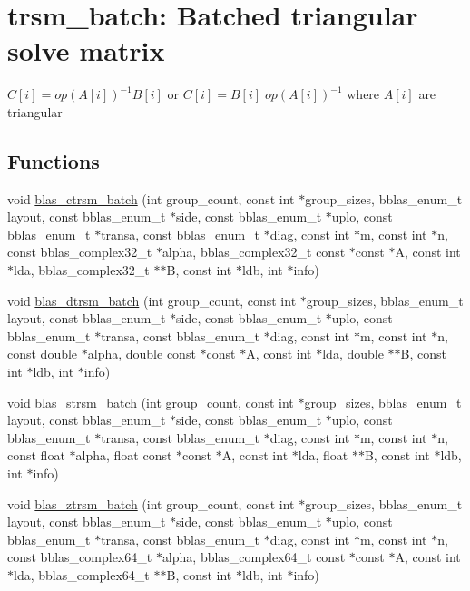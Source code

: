 \hypertarget{group__trsm__batch}{}\section{trsm\+\_\+batch\+: Batched triangular solve matrix}
\label{group__trsm__batch}


$ C[i] = op(A[i])^{-1} B[i] $ or $ C[i] = B[i] \;op(A[i])^{-1} $ where $ A[i] $ are triangular  


\subsection*{Functions}
\begin{DoxyCompactItemize}
\item 
void \mbox{\hyperlink{group__trsm__batch_ga99df0f7380cf330eebe672bf5c73beab}{blas\+\_\+ctrsm\+\_\+batch}} (int group\+\_\+count, const int $\ast$group\+\_\+sizes, bblas\+\_\+enum\+\_\+t layout, const bblas\+\_\+enum\+\_\+t $\ast$side, const bblas\+\_\+enum\+\_\+t $\ast$uplo, const bblas\+\_\+enum\+\_\+t $\ast$transa, const bblas\+\_\+enum\+\_\+t $\ast$diag, const int $\ast$m, const int $\ast$n, const bblas\+\_\+complex32\+\_\+t $\ast$alpha, bblas\+\_\+complex32\+\_\+t const $\ast$const $\ast$A, const int $\ast$lda, bblas\+\_\+complex32\+\_\+t $\ast$$\ast$B, const int $\ast$ldb, int $\ast$info)
\item 
void \mbox{\hyperlink{group__trsm__batch_ga373c220861d097741d02dc0e86937c0f}{blas\+\_\+dtrsm\+\_\+batch}} (int group\+\_\+count, const int $\ast$group\+\_\+sizes, bblas\+\_\+enum\+\_\+t layout, const bblas\+\_\+enum\+\_\+t $\ast$side, const bblas\+\_\+enum\+\_\+t $\ast$uplo, const bblas\+\_\+enum\+\_\+t $\ast$transa, const bblas\+\_\+enum\+\_\+t $\ast$diag, const int $\ast$m, const int $\ast$n, const double $\ast$alpha, double const $\ast$const $\ast$A, const int $\ast$lda, double $\ast$$\ast$B, const int $\ast$ldb, int $\ast$info)
\item 
void \mbox{\hyperlink{group__trsm__batch_ga9a65f883d9cfdf4ab1baf50342b2b39c}{blas\+\_\+strsm\+\_\+batch}} (int group\+\_\+count, const int $\ast$group\+\_\+sizes, bblas\+\_\+enum\+\_\+t layout, const bblas\+\_\+enum\+\_\+t $\ast$side, const bblas\+\_\+enum\+\_\+t $\ast$uplo, const bblas\+\_\+enum\+\_\+t $\ast$transa, const bblas\+\_\+enum\+\_\+t $\ast$diag, const int $\ast$m, const int $\ast$n, const float $\ast$alpha, float const $\ast$const $\ast$A, const int $\ast$lda, float $\ast$$\ast$B, const int $\ast$ldb, int $\ast$info)
\item 
void \mbox{\hyperlink{group__trsm__batch_gaf4c9a686763abe3d78be2b2746515a2c}{blas\+\_\+ztrsm\+\_\+batch}} (int group\+\_\+count, const int $\ast$group\+\_\+sizes, bblas\+\_\+enum\+\_\+t layout, const bblas\+\_\+enum\+\_\+t $\ast$side, const bblas\+\_\+enum\+\_\+t $\ast$uplo, const bblas\+\_\+enum\+\_\+t $\ast$transa, const bblas\+\_\+enum\+\_\+t $\ast$diag, const int $\ast$m, const int $\ast$n, const bblas\+\_\+complex64\+\_\+t $\ast$alpha, bblas\+\_\+complex64\+\_\+t const $\ast$const $\ast$A, const int $\ast$lda, bblas\+\_\+complex64\+\_\+t $\ast$$\ast$B, const int $\ast$ldb, int $\ast$info)
\end{DoxyCompactItemize}


